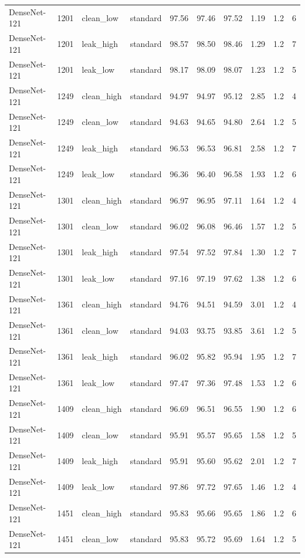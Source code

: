 {\begin{longtable}{lrllrrrrrr}
DenseNet-121 & 1201 & clean\_low & standard & 97.56 & 97.46 & 97.52 & 1.19 & 1.2 & 6 \\
DenseNet-121 & 1201 & leak\_high & standard & 98.57 & 98.50 & 98.46 & 1.29 & 1.2 & 7 \\
DenseNet-121 & 1201 & leak\_low & standard & 98.17 & 98.09 & 98.07 & 1.23 & 1.2 & 5 \\
DenseNet-121 & 1249 & clean\_high & standard & 94.97 & 94.97 & 95.12 & 2.85 & 1.2 & 4 \\
DenseNet-121 & 1249 & clean\_low & standard & 94.63 & 94.65 & 94.80 & 2.64 & 1.2 & 5 \\
DenseNet-121 & 1249 & leak\_high & standard & 96.53 & 96.53 & 96.81 & 2.58 & 1.2 & 7 \\
DenseNet-121 & 1249 & leak\_low & standard & 96.36 & 96.40 & 96.58 & 1.93 & 1.2 & 6 \\
DenseNet-121 & 1301 & clean\_high & standard & 96.97 & 96.95 & 97.11 & 1.64 & 1.2 & 4 \\
DenseNet-121 & 1301 & clean\_low & standard & 96.02 & 96.08 & 96.46 & 1.57 & 1.2 & 5 \\
DenseNet-121 & 1301 & leak\_high & standard & 97.54 & 97.52 & 97.84 & 1.30 & 1.2 & 7 \\
DenseNet-121 & 1301 & leak\_low & standard & 97.16 & 97.19 & 97.62 & 1.38 & 1.2 & 6 \\
DenseNet-121 & 1361 & clean\_high & standard & 94.76 & 94.51 & 94.59 & 3.01 & 1.2 & 4 \\
DenseNet-121 & 1361 & clean\_low & standard & 94.03 & 93.75 & 93.85 & 3.61 & 1.2 & 5 \\
DenseNet-121 & 1361 & leak\_high & standard & 96.02 & 95.82 & 95.94 & 1.95 & 1.2 & 7 \\
DenseNet-121 & 1361 & leak\_low & standard & 97.47 & 97.36 & 97.48 & 1.53 & 1.2 & 6 \\
DenseNet-121 & 1409 & clean\_high & standard & 96.69 & 96.51 & 96.55 & 1.90 & 1.2 & 6 \\
DenseNet-121 & 1409 & clean\_low & standard & 95.91 & 95.57 & 95.65 & 1.58 & 1.2 & 5 \\
DenseNet-121 & 1409 & leak\_high & standard & 95.91 & 95.60 & 95.62 & 2.01 & 1.2 & 7 \\
DenseNet-121 & 1409 & leak\_low & standard & 97.86 & 97.72 & 97.65 & 1.46 & 1.2 & 4 \\
DenseNet-121 & 1451 & clean\_high & standard & 95.83 & 95.66 & 95.65 & 1.86 & 1.2 & 6 \\
DenseNet-121 & 1451 & clean\_low & standard & 95.83 & 95.72 & 95.69 & 1.64 & 1.2 & 5 \\

\end{longtable}}
